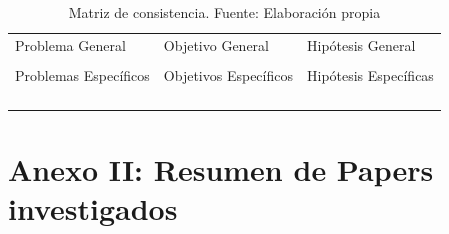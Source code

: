 \begin{table}[h!]
	\centering
	\small
	\begin{tabular}{ |m{5cm}|m{5cm}|m{5cm}|  }
		\hline
		\rowcolor{bluejean}
		\Centering \color{white}{PROBLEMAS}& \Centering \color{white}{OBJETIVOS}& \Centering \color{white}{HIPÓTESIS}\\
		\hline
		\rowcolor{turq}
		\Centering Problema General& \Centering Objetivo General & \Centering Hipótesis General \\
		\hline
		{\ProblemaGeneral} & { \ObjetivoGeneral} & {\HipotesisGeneral} \\
		\hline
		\rowcolor{turq}
		\Centering Problemas Específicos& \Centering Objetivos Específicos & \Centering Hipótesis Específicas \\
		\hline
		{\Pbone} & {\Objone} & {\Hone} \\
		\hline
		{\Pbtwo} & {\Objtwo} & {\Htwo} \\
		\hline
		{\Pbthree} & {\Objthree} & {\Hthree} \\
		\hline
		{\Pbfour} & {\Objfour} & {\Hfour} \\
		\hline
	\end{tabular}
	\caption{Matriz de consistencia. Fuente: Elaboración propia}
	\label{1:table}
\end{table}



\chapter{Anexo II: Resumen de Papers investigados}

